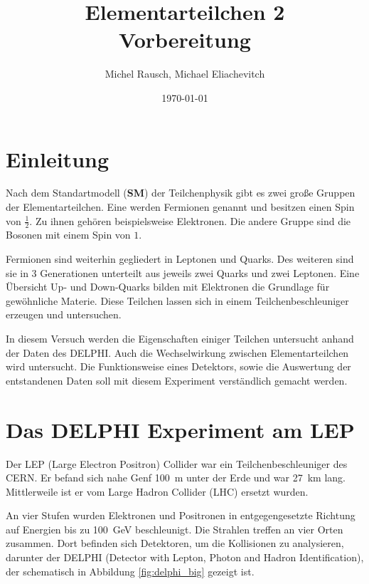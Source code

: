 \documentclass[a4paper,ngerman]{scrartcl}
\title{Elementarteilchen 2\\Vorbereitung}
\date{\today}
\author{Michel Rausch, Michael Eliachevitch}
\begin{document}
\maketitle
\tableofcontents
\newpage

\section{Einleitung}

Nach dem Standartmodell (\textbf{SM}) der Teilchenphysik gibt es zwei große Gruppen der Elementarteilchen.
Eine werden Fermionen genannt und besitzen einen Spin von $\frac{1}{2}$. 
Zu ihnen gehören beispielsweise Elektronen.
Die andere Gruppe sind die Bosonen mit einem Spin von $1$.

Fermionen sind weiterhin gegliedert in Leptonen und Quarks.
Des weiteren sind sie in 3 Generationen unterteilt aus jeweils zwei Quarks und zwei Leptonen. 
Eine Übersicht 
Up- und Down-Quarks bilden mit Elektronen die Grundlage für gewöhnliche Materie.
Diese Teilchen lassen sich in einem Teilchenbeschleuniger erzeugen und untersuchen.

In diesem Versuch werden die Eigenschaften einiger Teilchen untersucht anhand der Daten des DELPHI. 
Auch die Wechselwirkung zwischen Elementarteilchen wird untersucht.
Die Funktionsweise eines Detektors, sowie die Auswertung der entstandenen Daten soll mit diesem Experiment verständlich gemacht werden.



\section{Das DELPHI Experiment am LEP}
\label{sec:delphi}

Der LEP (Large Electron Positron) Collider war ein Teilchenbeschleuniger des CERN.
Er befand sich nahe Genf \SI{100}{\metre} unter der Erde und war \SI{27}{\kilo \metre} lang. 
Mittlerweile ist er vom Large Hadron Collider (LHC) ersetzt wurden.

An vier Stufen wurden Elektronen und Positronen in entgegengesetzte Richtung auf Energien bis zu \SI{100}{GeV} beschleunigt.
Die Strahlen treffen an vier Orten zusammen.
Dort befinden sich Detektoren, um die Kollisionen zu analysieren, darunter der DELPHI (Detector with Lepton, Photon and Hadron Identification), der schematisch in Abbildung \ref{fig:delphi_big} gezeigt ist.
\end{document}
